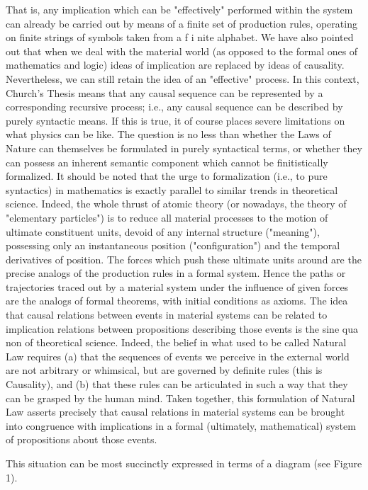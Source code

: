\documentclass[a4paper,12pt]{article}
\begin{document}
That is, any implication which can be "effectively" performed within the system can already be carried out by means of a finite set of production rules,
operating on finite strings of symbols taken from a f i nite alphabet. We have also pointed out that when we deal with the material world
(as opposed to the formal ones of mathematics and logic) ideas of implication are replaced by ideas of causality. Nevertheless, we can still
retain the idea of an "effective" process. In this context, Church's Thesis means that any causal sequence can be represented by a corresponding
recursive process; i.e., any causal sequence can be described by purely syntactic means. If this is true, it of course places severe
limitations on what physics can be like. The question is no less than whether the Laws of Nature can themselves be formulated in purely
syntactical terms, or whether they can possess an inherent semantic component which cannot be finitistically formalized.
It should be noted that the urge to formalization (i.e., to pure syntactics) in mathematics is exactly parallel to similar trends in theoretical science.
Indeed, the whole thrust of atomic theory (or nowadays, the theory of "elementary particles") is to reduce all material processes to the motion of
ultimate constituent units, devoid of any internal structure ("meaning"), possessing only an instantaneous position ("configuration")
and the temporal derivatives of position. The forces which push these ultimate units around are the precise analogs of the production rules in a formal system.
Hence the paths or trajectories traced out by a material system under the influence of given forces are the analogs of formal theorems,
with initial conditions as axioms. The idea that causal relations between events in material systems can be related to implication relations between
propositions describing those events is the sine qua non of theoretical science. Indeed, the belief in what used to be called Natural Law requires (a)
that the sequences of events we perceive in the external world are not arbitrary or whimsical, but are governed by definite rules (this is Causality),
and (b) that these rules can be articulated in such a way that they can be grasped by the human mind. Taken together, this formulation of Natural Law
asserts precisely that causal relations in material systems can be brought into congruence with implications in a
formal (ultimately, mathematical) system of propositions about those events.

This situation can be most succinctly expressed in terms of a diagram (see Figure 1).
\end{document}

